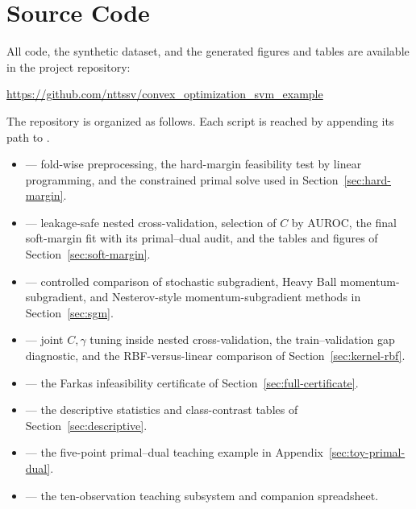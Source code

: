 \documentclass[11pt,a4paper]{article}
\numberwithin{equation}{section} %
\begin{document}
\section{Source Code}
\label{app:code}

All code, the synthetic dataset, and the generated figures and tables are
available in the project repository:
\begin{center}
\url{https://github.com/nttssv/convex_optimization_svm_example}
\end{center}

The repository is organized as follows. Each script is reached by appending
its path to
.

\begin{itemize}
    \item {} --- fold-wise
    preprocessing, the hard-margin feasibility test by linear programming, and
    the constrained primal solve used in Section~\ref{sec:hard-margin}.
    \item {} --- leakage-safe nested
    cross-validation, selection of $C$ by AUROC, the final soft-margin fit with
    its primal--dual audit, and the tables and figures of
    Section~\ref{sec:soft-margin}.
    \item {} --- controlled comparison
    of stochastic subgradient, Heavy Ball momentum-subgradient, and
    Nesterov-style momentum-subgradient methods in Section~\ref{sec:sgm}.
    \item {} --- joint $C,\gamma$ tuning inside
    nested cross-validation, the train--validation gap diagnostic, and the
    RBF-versus-linear comparison of Section~\ref{sec:kernel-rbf}.
    \item {} --- the
    Farkas infeasibility certificate of Section~\ref{sec:full-certificate}.
    \item {} --- the descriptive
    statistics and class-contrast tables of Section~\ref{sec:descriptive}.
    \item {} --- the
    five-point primal--dual teaching example in Appendix~\ref{sec:toy-primal-dual}.
    \item {} --- the
    ten-observation teaching subsystem and companion spreadsheet.

\end{itemize}
\end{document}
